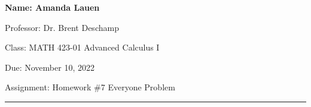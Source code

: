 \documentclass[10pt]{article}
\theoremstyle{definition}
\begin{document}
\pagestyle{empty}  %

\begin{center}  %

{\bf 
Name: Amanda Lauen

Professor: Dr. Brent Deschamp

Class: MATH 423-01  Advanced Calculus I

Due: November 10, 2022

Assignment: Homework \#7 Everyone Problem 

}

\end{center}

\medskip

\hrule   %

\bigskip

\end{document}
